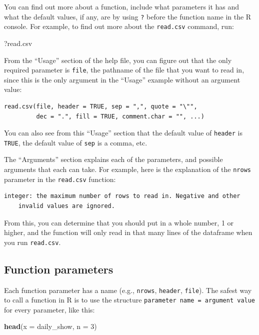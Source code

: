 \documentclass[]{book}
\makeatletter
\newenvironment{Shaded}{\begin{snugshade}}{\end{snugshade}}
\newcommand{\KeywordTok}[1]{\textcolor[rgb]{0.13,0.29,0.53}{\textbf{#1}}}
\newcommand{\DataTypeTok}[1]{\textcolor[rgb]{0.13,0.29,0.53}{#1}}
\newcommand{\DecValTok}[1]{\textcolor[rgb]{0.00,0.00,0.81}{#1}}
\newcommand{\NormalTok}[1]{#1}
\newenvironment{kframe}{%
\medskip{}
\setlength{\fboxsep}{.8em}
 \def\at@end@of@kframe{}%
 \ifinner\ifhmode%
  \def\at@end@of@kframe{\end{minipage}}%
  \begin{minipage}{\columnwidth}%
 \fi\fi%
 \def\FrameCommand##1{\hskip\@totalleftmargin \hskip-\fboxsep
 \colorbox{shadecolor}{##1}\hskip-\fboxsep
     \hskip-\linewidth \hskip-\@totalleftmargin \hskip\columnwidth}%
 \MakeFramed {\advance\hsize-\width
   \@totalleftmargin\z@ \linewidth\hsize
   \@setminipage}}%
 {\par\unskip\endMakeFramed%
 \at@end@of@kframe}
\renewenvironment{Shaded}{\begin{kframe}}{\end{kframe}}
\theoremstyle{definition}
\theoremstyle{definition}
\theoremstyle{definition}
\theoremstyle{remark}
\makeatother
\begin{document}
You can find out more about a function, include what parameters it has
and what the default values, if any, are by using \texttt{?} before the
function name in the R console. For example, to find out more about the
\texttt{read.csv} command, run:

\begin{Shaded}
\begin{Highlighting}[]
\NormalTok{?read.csv}
\end{Highlighting}
\end{Shaded}

From the ``Usage'' section of the help file, you can figure out that the
only required parameter is \texttt{file}, the pathname of the file that
you want to read in, since this is the only argument in the ``Usage''
example without an argument value:

\begin{verbatim}
read.csv(file, header = TRUE, sep = ",", quote = "\"",
         dec = ".", fill = TRUE, comment.char = "", ...)
\end{verbatim}

You can also see from this ``Usage'' section that the default value of
\texttt{header} is \texttt{TRUE}, the default value of \texttt{sep} is a
comma, etc.

The ``Arguments'' section explains each of the parameters, and possible
arguments that each can take. For example, here is the explanation of
the \texttt{nrows} parameter in the \texttt{read.csv} function:

\begin{verbatim}
integer: the maximum number of rows to read in. Negative and other 
    invalid values are ignored.
\end{verbatim}

From this, you can determine that you should put in a whole number, 1 or
higher, and the function will only read in that many lines of the
dataframe when you run \texttt{read.csv}.

\subsection{Function parameters}\label{function-parameters}

Each function parameter has a name (e.g., \texttt{nrows},
\texttt{header}, \texttt{file}). The safest way to call a function in R
is to use the structure \texttt{parameter\ name\ =\ argument\ value} for
every parameter, like this:

\begin{Shaded}
\begin{Highlighting}[]
\KeywordTok{head}\NormalTok{(}\DataTypeTok{x =}\NormalTok{ daily_show, }\DataTypeTok{n =} \DecValTok{3}\NormalTok{)}
\end{Highlighting}
\end{Shaded}
\end{document}
